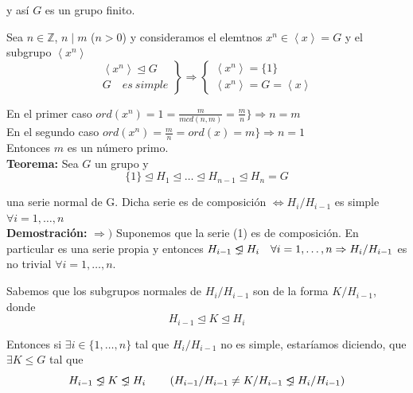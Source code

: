 \documentclass{article}
\newcommand{\unlhdneq}{%
  \mathrel{\ooalign{$\lneq$\cr\raise.22ex\hbox{$\lhd$}\cr}}}
\begin{document}
y así $G$ es un grupo finito.

Sea $n\in \mathbb{Z}$, $n\mid m$ ($n>0$) y consideramos el elemtnos $x^n\in \left\langle x \right\rangle =G$ y el subgrupo $\left\langle x^n\right\rangle$
\begin{equation*}
\left. \begin{array}{c}
\left\langle x^n\right\rangle \unlhd G\\
G\quad es\:simple
\end{array}\right\rbrace \Rightarrow \left\lbrace \begin{array}{c}
\left\langle x^n \right\rangle=\{1\} \\
\left\langle x^n \right\rangle = G =\left\langle x \right\rangle  
\end{array} \right.
\end{equation*}

En el primer caso $ord(x^n)=1=\frac{m}{mcd(n,m)}=\frac{m}{n}\}\Rightarrow n=m$ \\

En el segundo caso $ord(x^n)=\frac{m}{n}=ord(x)=m\}\Rightarrow n=1$ \\

Entonces $m$ es un número primo. \\

\textbf{Teorema:} Sea $G$ un grupo y 
\begin{equation*}
\{1\}\unlhd H_1\unlhd \ldots \unlhd H_{n-1}\unlhd H_n=G
\end{equation*}

una serie normal de G. Dicha serie es de composición $\Leftrightarrow H_i/H_{i-1}$ es simple $\forall i=1,\ldots,n$ \\

\textbf{Demostración:} $\Rightarrow)$ Suponemos que la serie (1) es de composición. En particular es una serie propia y entonces $H_{i-1}\unlhdneq H_i \quad \forall i=1,\ldots,n\Rightarrow H_i/H_{i-1}$ es no trivial $\forall i=1,\ldots,n$.

Sabemos que los subgrupos normales de $H_i/H_{i-1}$ son de la forma $K/H_{i-1}$, donde
\begin{equation*}
H_{i-1}\unlhd K\unlhd H_i
\end{equation*}

Entonces si $\exists i\in \{1,\ldots,n\}$ tal que $H_i/H_{i-1}$ no es simple, estaríamos diciendo, que $\exists K\leq G$ tal que
\begin{equation*}
H_{i-1}\unlhdneq K\unlhdneq H_i \qquad \left( H_{i-1}/H_{i-1}\neq K/H_{i-1}\unlhdneq H_i/H_{i-1} \right)
\end{equation*}
\end{document}
